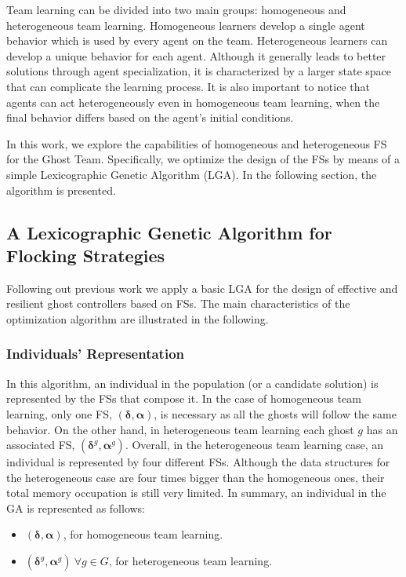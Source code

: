 \documentclass[journal]{IEEEtran}
\begin{document}
Team learning can be divided into two main groups: homogeneous and
heterogeneous team learning. Homogeneous learners develop a single
agent behavior which is used by every agent on the team. Heterogeneous
learners can develop a unique behavior for each agent. Although it
generally leads to better solutions through agent specialization, it
is characterized by a larger state space that can complicate the learning process. It is also
 important to notice that agents can act heterogeneously even in
 homogeneous team learning, when the final behavior differs based on
 the agent's initial conditions. 

In this work, we explore the capabilities of homogeneous and heterogeneous FS for the Ghost Team. Specifically, we optimize the design of the FSs by means of a simple Lexicographic Genetic Algorithm (LGA). In the following section, the algorithm is presented.

\subsection{A Lexicographic Genetic Algorithm for Flocking Strategies}
Following out previous work \cite{Liberatore2014} we apply a basic LGA for the design of effective and resilient ghost controllers based on FSs. The main characteristics of the optimization algorithm are illustrated in the following.

\subsubsection{Individuals' Representation}
In this algorithm, an individual in the population (or a candidate solution) is represented by the FSs that compose it. In the case of homogeneous team learning, only one FS, $(\boldsymbol\delta, \boldsymbol\alpha)$, is necessary as all the ghosts will follow the same behavior. On the other hand, in heterogeneous team learning each ghost $g$ has an associated FS, $(\boldsymbol\delta^g,  \boldsymbol\alpha^g)$. Overall, in the heterogeneous team learning case, an individual is represented by four different FSs. Although the data structures for the heterogeneous case are four times bigger than the homogeneous ones, their total memory occupation is still very limited. In summary, an individual in the GA is represented as follows:

\begin{itemize}
  \item $(\boldsymbol\delta, \boldsymbol\alpha)$, for homogeneous team learning.
  \item $(\boldsymbol\delta^g, \boldsymbol\alpha^g)\: \forall g \in G$, for heterogeneous team learning.
\end{itemize}
\end{document}
